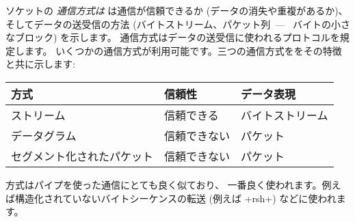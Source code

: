 ソケットの \emph{通信方式は} は通信が信頼できるか (データの消失や重複があるか)、
そしてデータの送受信の方法 (バイトストリーム、パケット列~---~ バイトの小さなブロック) を示します。
通信方式はデータの送受信に使われるプロトコルを規定します。
いくつかの通信方式が利用可能です。三つの通信方式ををその特徴と共に示します:
%
\begin{center}
\begin{tabular}{lll}
  方式 & 信頼性 & データ表現 \\
  \hline
  ストリーム & 信頼できる & バイトストリーム \\
  データグラム & 信頼できない & パケット \\
  セグメント化されたパケット & 信頼できない & パケット \\
\hline
\end{tabular}
\end{center}
%
 方式はパイプを使った通信にとても良く似ており、
一番良く使われます。例えば構造化されていないバイトシーケンスの転送 (例えば \ml+rsh+) などに使われます。
